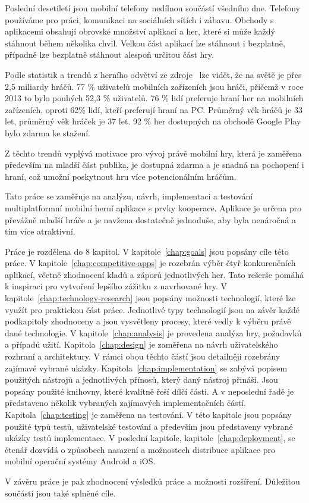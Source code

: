 \begin{introduction}
Poslední desetiletí jsou mobilní telefony nedílnou součástí všedního dne.
Telefony používáme pro práci, komunikaci na sociálních sítích i zábavu.
Obchody s aplikacemi obsahují obrovské množství aplikací a her,
které si může každý stáhnout během několika chvil.
Velkou část aplikací lze stáhnout i bezplatně,
případně lze bezplatně stáhnout alespoň určitou část hry.

Podle statistik a trendů z herního odvětví
ze zdroje~\cite{wepc_video_game_statistics} lze vidět,
že na světě je přes 2,5 miliardy hráčů.
77 \% uživatelů mobilních zařízeních jsou hráči,
přičemž v roce 2013 to bylo pouhých 52,3 \% uživatelů.
76 \% lidí preferuje hraní her na mobilních zařízeních,
oproti 62\% lidí, kteří preferují hraní na PC.
Průměrný věk hráčů je 33 let, průměrný věk hráček je 37 let.
92 \% her dostupných na obchodě Google Play bylo
zdarma ke stažení.~\cite{wepc_video_game_statistics}

Z těchto trendů vyplývá motivace pro vývoj právě mobilní hry,
která je zaměřena především na mladší část publika,
je dostupná zdarma a je snadná na pochopení i hraní,
což umožní poskytnout hru více potencionálním hráčům.

Tato práce se zaměřuje na analýzu, návrh, implementaci a testování
multiplatformní mobilní herní aplikace s prvky kooperace.
Aplikace je určena pro převážně mladší hráče
a je navžena dostatečně jednoduše,
aby byla nenáročná a tím více atraktivní.

Práce je rozdělena do 8 kapitol.
V kapitole~\ref{chap:goals} jsou popsány cíle této práce.
V kapitole~\ref{chap:competitive-apps} je rozebrán výběr čtyř konkurenčních aplikací,
včetně zhodnocení kladů a záporů jednotlivých her.
Tato rešerše pomáhá k inspiraci pro vytvoření lepšího zážitku z navrhované hry.
V kapitole~\ref{chap:technology-research} jsou popsány možnosti technologií,
které lze využít pro praktickou část práce.
Jednotlivé typy technologií jsou na závěr každé podkapitoly zhodnoceny
a jsou vysvětleny procesy, které vedly k výběru právě dané technologie.
V kapitole~\ref{chap:analysis} je provedena analýza hry, požadavků a případů užití.
Kapitola~\ref{chap:design} je zaměřena na návrh uživatelského rozhraní a
architektury.
V rámci obou těchto částí jsou detailněji rozebrány zajímavé vybrané ukázky.
Kapitola~\ref{chap:implementation} se zabývá popisem použitých nástrojů
a jednotlivých přínosů, který daný nástroj přináší.
Jsou popsány použité knihovny, které kvalitně řeší dílčí části.
A v neposlední řadě je představeno několik vybraných zajímavých
implementačních částí.
Kapitola~\ref{chap:testing} je zaměřena na testování.
V této kapitole jsou popsány použité typů testů,
uživatelské testování a především jsou představeny vybrané ukázky testů
implementace.
V poslední kapitole, kapitole~\ref{chap:deployment}, se čtenář dozvídá o způsobech nasazení a
možnostech distribuce aplikace pro mobilní operační systémy Android a iOS.

V závěru práce je pak zhodnocení výsledků práce a možnosti rozšíření.
Důležitou součástí jsou také splněné cíle.
\end{introduction}

